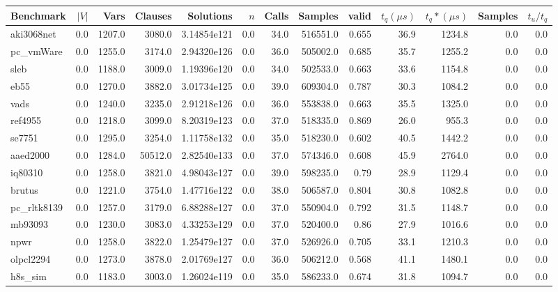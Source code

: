 \begin{tabular}{|l r r r r| r r r r r r | r r|}
\hline
Benchmark & $|V|$ & Vars & Clauses & Solutions & $n$ & Calls & Samples & valid & $t_q (\mu s)$ & $t_q* (\mu s)$ & Samples & $t_u/t_q$ \\
\hline
aki3068net & 0.0 & 1207.0 & 3080.0 & 3.14854e121 & 0.0 & 34.0 & 516551.0 & 0.655 & 36.9 & 1234.8 & 0.0 & 0.0 \\
\hline
pc\_vmWare & 0.0 & 1255.0 & 3174.0 & 2.94320e126 & 0.0 & 36.0 & 505002.0 & 0.685 & 35.7 & 1255.2 & 0.0 & 0.0 \\
\hline
sleb & 0.0 & 1188.0 & 3009.0 & 1.19396e120 & 0.0 & 34.0 & 502533.0 & 0.663 & 33.6 & 1154.8 & 0.0 & 0.0 \\
\hline
eb55 & 0.0 & 1270.0 & 3882.0 & 3.01734e125 & 0.0 & 39.0 & 609304.0 & 0.787 & 30.3 & 1084.2 & 0.0 & 0.0 \\
\hline
vads & 0.0 & 1240.0 & 3235.0 & 2.91218e126 & 0.0 & 36.0 & 553838.0 & 0.663 & 35.5 & 1325.0 & 0.0 & 0.0 \\
\hline
ref4955 & 0.0 & 1218.0 & 3099.0 & 8.20319e123 & 0.0 & 37.0 & 518335.0 & 0.869 & 26.0 & 955.3 & 0.0 & 0.0 \\
\hline
se7751 & 0.0 & 1295.0 & 3254.0 & 1.11758e132 & 0.0 & 35.0 & 518230.0 & 0.602 & 40.5 & 1442.2 & 0.0 & 0.0 \\
\hline
aaed2000 & 0.0 & 1284.0 & 50512.0 & 2.82540e133 & 0.0 & 37.0 & 574346.0 & 0.608 & 45.9 & 2764.0 & 0.0 & 0.0 \\
\hline
iq80310 & 0.0 & 1258.0 & 3821.0 & 4.98043e127 & 0.0 & 39.0 & 598235.0 & 0.79 & 28.9 & 1129.4 & 0.0 & 0.0 \\
\hline
brutus & 0.0 & 1221.0 & 3754.0 & 1.47716e122 & 0.0 & 38.0 & 506587.0 & 0.804 & 30.8 & 1082.8 & 0.0 & 0.0 \\
\hline
pc\_rltk8139 & 0.0 & 1257.0 & 3179.0 & 6.88288e127 & 0.0 & 37.0 & 550904.0 & 0.792 & 31.5 & 1148.7 & 0.0 & 0.0 \\
\hline
mb93093 & 0.0 & 1230.0 & 3083.0 & 4.33253e129 & 0.0 & 37.0 & 520400.0 & 0.86 & 27.9 & 1016.6 & 0.0 & 0.0 \\
\hline
npwr & 0.0 & 1258.0 & 3822.0 & 1.25479e127 & 0.0 & 37.0 & 526926.0 & 0.705 & 33.1 & 1210.3 & 0.0 & 0.0 \\
\hline
olpcl2294 & 0.0 & 1273.0 & 3878.0 & 2.01769e127 & 0.0 & 36.0 & 506212.0 & 0.568 & 41.1 & 1480.1 & 0.0 & 0.0 \\
\hline
h8s\_sim & 0.0 & 1183.0 & 3003.0 & 1.26024e119 & 0.0 & 35.0 & 586233.0 & 0.674 & 31.8 & 1094.7 & 0.0 & 0.0 \\

\end{tabular}
